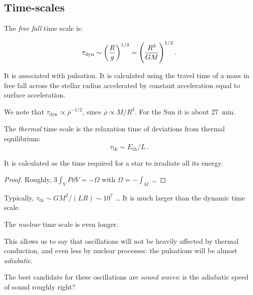 \documentclass[main.tex]{subfiles}
\begin{document}




\subsection{Time-scales}

The \emph{free fall} time scale is:

\begin{equation}
  \tau_{\text{dyn}} \sim \qty(\frac{R}{g} )^{1/2} = \qty(\frac{R^3}{GM} )^{1/2}\,.
\end{equation}

It is associated with pulsation. It is calculated using the travel time of a mass in free fall across the stellar radius accelerated by constant acceleration equal to surface acceleration.

We note that \(\tau_{\text{dyn}} \propto \overline{\rho} ^{-1/2} \), since \(\overline{\rho} \propto M / R^3\). For the Sun it is about \SI{27}{min}.

The \emph{thermal} time scale is the relaxation time of deviations from thermal equilibrium:
%
\begin{equation}
  \tau_{\text{th}} \sim E_{\text{th}} / L\,.
\end{equation}

It is calculated as the time required for a star to irradiate all its energy.

\begin{proof}
    Roughly, \(3 \int_V P \dd{V} = - \Omega\) with  \(\Omega = - \int_M \) \dots
\end{proof}

Typically, \(\tau_{\text{th}} \sim G M^2 /(LR) \sim 10^7 \) \dots
It is much larger than the dynamic time scale.

The \emph{nuclear} time scale is even longer.

This allows us to say that oscillations will not be heavily affected by thermal conduction, and even less by nuclear processes: the pulsations will be almost \emph{adiabatic}.

The best candidate for these oscillations are \emph{sound waves}: is the adiabatic speed of sound roughly right?
\end{document}
